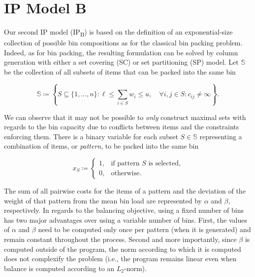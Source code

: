 \documentclass{llncs}
\begin{document}


\section{IP Model B}
\label{sec:ip_model_b}

\paragraph{}Our second IP model (IP\textsubscript{B}) is based on the definition of an exponential-size collection of possible bin compositions as for the classical bin packing problem. Indeed, as for bin packing, the resulting formulation can be solved by column generation with either a set covering (SC) or set partitioning (SP) model. Let $\mathbb{S}$ be the collection of all subsets of items that can be packed into the same bin

\[
\mathbb{S} \coloneqq \left\{ S \subseteq \{1, \dots, n\} : \ell \leq \sum_{i \in S} w_{i} \leq u, \quad \forall i, j \in S:c_{ij} \neq \infty\right\}.
\]

We can observe that it may not be possible to \emph{only} construct maximal sets with regards to the bin capacity due to conflicts between items and the constraints enforcing them. There is a binary variable for each subset $S \in \mathbb{S}$ representing a combination of items, or \emph{pattern}, to be packed into the same bin

\begin{equation}
  x_{S}\coloneqq
  \begin{cases}
    1, & \mbox{if pattern $S$ is selected,} \\
    0, & \mbox{otherwise.}
  \end{cases}
\end{equation}

The sum of all pairwise costs for the items of a pattern and the deviation of the weight of that pattern from the mean bin load are represented by $\alpha$ and $\beta$, respectively. In regards to the balancing objective, using a fixed number of bins has two major advantages over using a variable number of bins. First, the values of $\alpha$ and $\beta$ need to be computed only once per pattern (when it is generated) and remain constant throughout the process. Second and more importantly, since $\beta$ is computed outside of the program, the norm according to which it is computed does not complexify the problem (i.e., the program remains linear even when balance is computed according to an $L_{2}$-norm).
\end{document}
